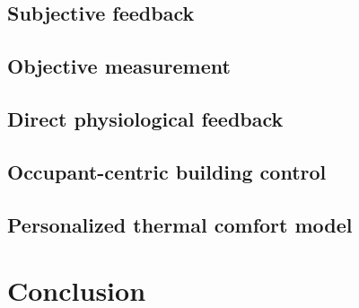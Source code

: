 \documentclass[review]{elsarticle}
\begin{document}
    \subsection{Subjective feedback}
    
    \subsection{Objective measurement}
    
        \subsection{Direct physiological feedback}

        \subsection{Occupant-centric building control}
        \subsection{Personalized thermal comfort model}
        
\section{Conclusion}


\end{document}
